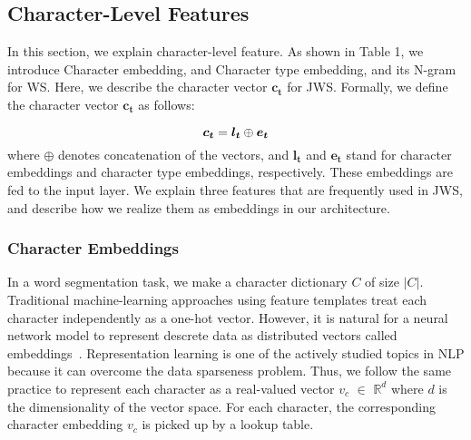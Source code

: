 \documentclass[11pt,letterpaper]{article}
\begin{document}


\subsection{Character-Level Features}
In this section, we explain character-level feature. As shown in Table 1, we introduce Character embedding, and Character type embedding, and its N-gram for WS. Here, we describe the character vector $\bm{c_{t}}$ for JWS. Formally, we define the character vector $\bm{c_{t}}$ as follows:

\begin{equation}
\bm{c_{t}} = \bm{l_{t}} \oplus \bm{e_{t}}
\vspace{6pt}
\end{equation}
where $\oplus$ denotes concatenation of the vectors, and $\bm{l_{t}} $ and $ \bm{e_{t}}$ stand for  character embeddings and character type embeddings, respectively. These embeddings are fed to the input layer. We explain three features that are frequently used in JWS, and describe how we realize them as embeddings in our architecture.

\subsubsection{Character Embeddings}


In a word segmentation task, we make a character dictionary $C$ of size $|C|$. 
Traditional machine-learning approaches using feature templates treat each character independently as a one-hot vector.
However, it is natural for a neural network model to represent descrete data as distributed vectors called embeddings~\cite{Bengio:2003:NPL:944919.944966,collobert:2008}. Representation learning is one of the actively studied topics in NLP because it can overcome the data sparseness problem. Thus, we follow the same practice to represent each character  as a real-valued vector $v_{c}$ $\in$ $\mathbb{R}^{d}$ where $d$ is the dimensionality of the vector space. 
For each character, the corresponding character embedding $v_{c}$ is picked up by a lookup table. 
\end{document}
